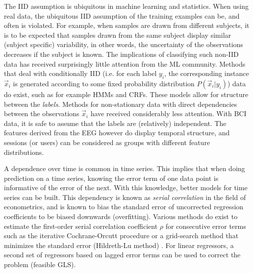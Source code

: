 The \ac{IID} assumption is ubiquitous in machine learning and statistics. When
using real data, the ubiquitous \ac{IID} assumption of the training examples
can be, and often is violated. For example, when samples are drawn from
different subjects, it is to be expected that samples drawn from the same
subject display similar (subject specific) variability, in other words, the uncertainty of
the observations decreases if the subject is known. 
%
The implications of classifying such non-\ac{IID} data has received
surprisingly little attention from the \ac{ML} community. Methods that deal with
conditionally \ac{IID} (i.e. for each label $y_i$, the corresponding instance
$\vec{x}_i$ is generated according to some fixed probability distribution
$P(\vec{x}_i | y_i)$) data do exist, such as for example \acp{HMM} and
\acp{CRF}. These models allow for structure between the \emph{labels}. Methods
for non-stationary data with direct dependencies between the observations
$\vec{x}_i$ have received considerably less attention.
%
With \ac{BCI} data, it is safe to assume that the labels are (relatively)
independent. The features derived from the \ac{EEG} however do display temporal
structure, and sessions (or users) can be considered as groups with different
feature distributions.

A dependence over time is common in time series. This implies that when doing
prediction on a time series, knowing the error term of one data point is
informative of the error of the next. With this knowledge, better models for
time series can be built. This dependency is known as \emph{serial correlation}
in the field of econometrics, and is known to bias the standard error of
uncorrected regression coefficients to be biased downwards (overfitting).
Various methods do exist to estimate the first-order serial correlation
coefficient $\rho$ for consecutive error terms such as the iterative
Cochrane-Orcutt procedure or a grid-search method that minimizes the standard
error (Hildreth-Lu method) \cite{pindyck1991eme}. For linear regressors, a
second set of regressors based on lagged error terms can be used to correct the
problem (feasible \acl{GLS}).
 
